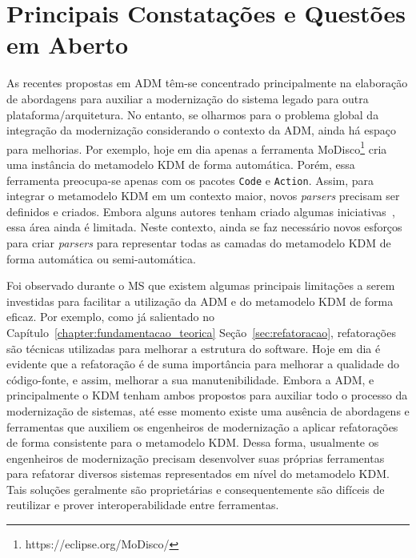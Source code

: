 \section{Principais Constatações e Questões em Aberto}\label{subsec:principais_constatações_e_questões_Em_Aberto}

As recentes propostas em ADM têm-se concentrado principalmente na elaboração de abordagens para auxiliar a modernização do sistema legado para outra plataforma/arquitetura. No entanto, se olharmos para o problema global da integração da modernização considerando o contexto da ADM, ainda há espaço para melhorias. Por exemplo, hoje em dia apenas a ferramenta MoDisco\footnote{https://eclipse.org/MoDisco/} cria uma instância do metamodelo KDM de forma automática. Porém, essa ferramenta preocupa-se apenas com os pacotes \texttt{Code} e \texttt{Action}. Assim, para integrar o metamodelo KDM em um contexto maior, novos \textit{parsers} precisam ser definidos e criados. Embora alguns autores tenham criado algumas iniciativas~\cite{5440163,Bruneliere_2010MODISCO}, essa área ainda é limitada. Neste contexto, ainda se faz necessário novos esforços para criar \textit{parsers} para representar todas as camadas do metamodelo KDM de forma automática ou semi-automática.

Foi observado durante o MS que existem algumas principais limitações a serem investidas para facilitar a utilização da ADM e do metamodelo KDM de forma eficaz. Por exemplo, como já salientado no Capítulo~\ref{chapter:fundamentacao_teorica} Seção~\ref{sec:refatoracao}, refatorações são técnicas utilizadas para melhorar a estrutura do software. Hoje em dia é evidente que a refatoração é de suma importância para melhorar a qualidade do código-fonte, e assim, melhorar a sua manutenibilidade.
Embora a ADM, e principalmente o KDM tenham ambos propostos para auxiliar todo o processo da modernização de sistemas, até esse momento existe uma ausência de abordagens e ferramentas que auxiliem os engenheiros de modernização a aplicar refatorações de forma consistente para o metamodelo KDM. Dessa forma, usualmente os engenheiros de modernização precisam desenvolver suas próprias ferramentas para refatorar diversos sistemas representados em nível do metamodelo KDM. Tais soluções geralmente são proprietárias e consequentemente são difíceis de reutilizar e prover interoperabilidade entre ferramentas.

